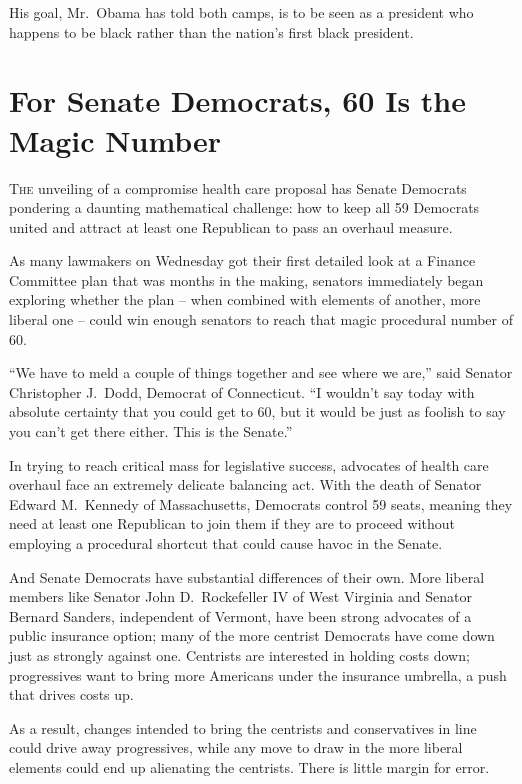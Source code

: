 ﻿\documentclass[12pt]{article}
\begin{document}
His goal, Mr.~Obama has told both camps, is to be seen as a president who happens to be black rather
than the nation's first black president.

\section{For Senate Democrats, 60 Is the Magic Number}

\lettrine{T}{he} unveiling of a compromise health care proposal has Senate Democrats pondering a
daunting mathematical challenge: how to keep all 59 Democrats united and attract at least one
Republican to pass an overhaul measure.

As many lawmakers on Wednesday got their first detailed look at a Finance Committee plan that was
months in the making, senators immediately began exploring whether the plan -- when combined with
elements of another, more liberal one -- could win enough senators to reach that magic procedural
number of 60.

``We have to meld a couple of things together and see where we are,'' said Senator Christopher
J.~Dodd, Democrat of Connecticut. ``I wouldn't say today with absolute certainty that you could get
to 60, but it would be just as foolish to say you can't get there either. This is the Senate.''

In trying to reach critical mass for legislative success, advocates of health care overhaul face an
extremely delicate balancing act. With the death of Senator Edward M.~Kennedy of Massachusetts,
Democrats control 59 seats, meaning they need at least one Republican to join them if they are to
proceed without employing a procedural shortcut that could cause havoc in the Senate.

And Senate Democrats have substantial differences of their own. More liberal members like Senator
John D.~Rockefeller IV of West Virginia and Senator Bernard Sanders, independent of Vermont, have
been strong advocates of a public insurance option; many of the more centrist Democrats have come
down just as strongly against one. Centrists are interested in holding costs down; progressives want
to bring more Americans under the insurance umbrella, a push that drives costs up.

As a result, changes intended to bring the centrists and conservatives in line could drive away
progressives, while any move to draw in the more liberal elements could end up alienating the
centrists. There is little margin for error.
\end{document}
